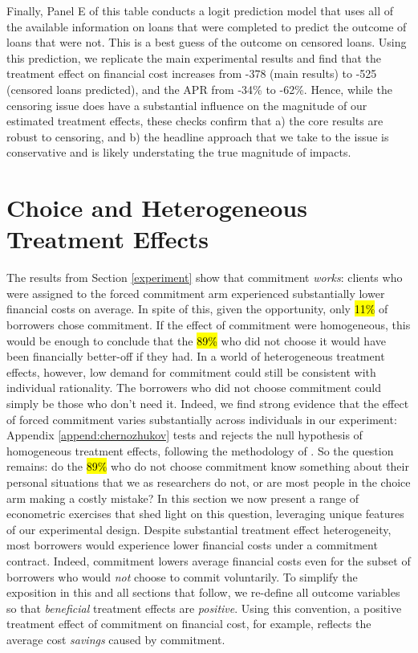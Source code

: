 \documentclass[oneside,11pt]{article}
\begin{document}
Finally, Panel E of this table conducts a logit prediction model that uses all of the available information on loans that were completed to predict the outcome of loans that were not.  This is a best guess of the outcome on censored loans.  Using this prediction, we replicate the main experimental results and find that the treatment effect on financial cost increases from -378 (main results) to -525 (censored loans predicted), and the APR from -34\% to -62\%.  Hence, while the censoring issue does have a substantial influence on the magnitude of our estimated treatment effects, these  checks confirm that a) the core results are robust to censoring, and b) the headline approach that we take to the issue is conservative and is likely understating the true magnitude of impacts.






\section{Choice and Heterogeneous Treatment Effects}
\label{sec:choice}

The results from Section \ref{experiment} show that commitment \emph{works}: clients who were assigned to the forced commitment arm experienced substantially lower financial costs on average.
In spite of this, given the opportunity, only \hl{11\%} of borrowers chose commitment. 
If the effect of commitment were homogeneous, this would be enough to conclude that the \hl{89\%} who did not choose it would have been financially better-off if they had.
In a world of heterogeneous treatment effects, however, low demand for commitment could still be consistent with individual rationality.
The borrowers who did not choose commitment could simply be those who don't need it. 
Indeed, we find strong evidence that the effect of forced commitment varies substantially across individuals in our experiment: Appendix \ref{append:chernozhukov} tests and rejects the null hypothesis of homogeneous treatment effects, following the methodology of \cite{chernozhukov2018generic}.
So the question remains: do the \hl{89\%} who do not choose commitment know something about their personal situations that we as researchers do not, or are most people in the choice arm making a costly mistake? 
In this section we now present a range of econometric exercises that shed light on this question, leveraging unique features of our experimental design. 
Despite substantial treatment effect heterogeneity, most borrowers would experience lower financial costs under a commitment contract. 
Indeed, commitment lowers average financial costs even for the subset of borrowers who would \emph{not} choose to commit voluntarily.
To simplify the exposition in this and all sections that follow, we re-define all outcome variables so that \emph{beneficial} treatment effects are \emph{positive}. Using this convention, a positive treatment effect of commitment on financial cost, for example, reflects the average cost \emph{savings} caused by commitment.
\end{document}
